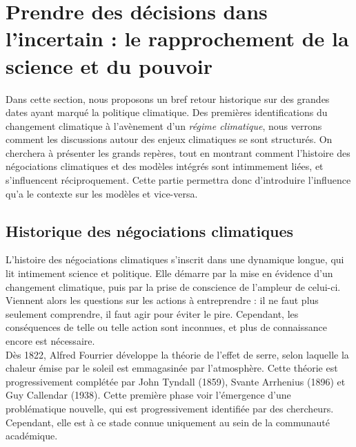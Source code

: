 \section{Prendre des décisions dans l'incertain : le rapprochement de la science et du pouvoir}
\label{sect/1/2}

Dans cette section, nous proposons un bref retour historique sur des grandes dates ayant marqué la politique climatique. Des premières identifications du changement climatique à l'avènement d'un \emph{régime climatique}, nous verrons comment les discussions autour des enjeux climatiques se sont structurés. On cherchera à présenter les grands repères, tout en montrant comment l'histoire des négociations climatiques et des modèles intégrés sont intimmement liées, et s'influencent réciproquement. Cette partie permettra donc d'introduire l'influence qu'a le contexte sur les modèles et vice-versa. 


\subsection{Historique des négociations climatiques}
\label{sect:1.2.1}

L'histoire des négociations climatiques s'inscrit dans une dynamique longue, qui lit intimement science et politique. Elle démarre par la mise en évidence d'un changement climatique, puis par la prise de conscience de l'ampleur de celui-ci. Viennent alors les questions sur les actions à entreprendre : il ne faut plus seulement comprendre, il faut agir pour éviter le pire. Cependant, les conséquences de telle ou telle action sont inconnues, et plus de connaissance encore est nécessaire. \\

Dès 1822, Alfred Fourrier développe la théorie de l'effet de serre, selon laquelle la chaleur émise par le soleil est emmagasinée par l'atmosphère. Cette théorie est progressivement complétée par John Tyndall (1859), Svante Arrhenius (1896) et Guy Callendar (1938). Cette première phase voir l'émergence d'une problématique nouvelle, qui est progressivement identifiée par des chercheurs. Cependant, elle est à ce stade connue uniquement au sein de la communauté académique. \\

